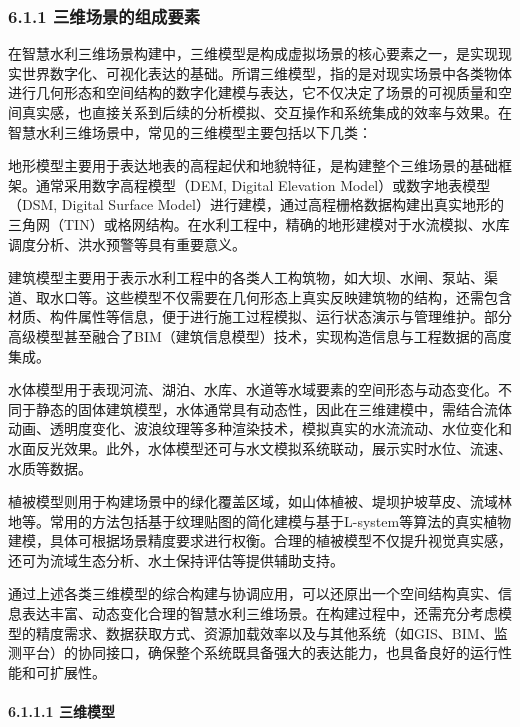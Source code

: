 \subsubsection{6.1.1 三维场景的组成要素}\label{ux4e09ux7ef4ux573aux666fux7684ux7ec4ux6210ux8981ux7d20}

在智慧水利三维场景构建中，三维模型是构成虚拟场景的核心要素之一，是实现现实世界数字化、可视化表达的基础。所谓三维模型，指的是对现实场景中各类物体进行几何形态和空间结构的数字化建模与表达，它不仅决定了场景的可视质量和空间真实感，也直接关系到后续的分析模拟、交互操作和系统集成的效率与效果。在智慧水利三维场景中，常见的三维模型主要包括以下几类：

地形模型主要用于表达地表的高程起伏和地貌特征，是构建整个三维场景的基础框架。通常采用数字高程模型（DEM, Digital Elevation Model）或数字地表模型（DSM, Digital Surface Model）进行建模，通过高程栅格数据构建出真实地形的三角网（TIN）或格网结构。在水利工程中，精确的地形建模对于水流模拟、水库调度分析、洪水预警等具有重要意义。

建筑模型主要用于表示水利工程中的各类人工构筑物，如大坝、水闸、泵站、渠道、取水口等。这些模型不仅需要在几何形态上真实反映建筑物的结构，还需包含材质、构件属性等信息，便于进行施工过程模拟、运行状态演示与管理维护。部分高级模型甚至融合了BIM（建筑信息模型）技术，实现构造信息与工程数据的高度集成。

水体模型用于表现河流、湖泊、水库、水道等水域要素的空间形态与动态变化。不同于静态的固体建筑模型，水体通常具有动态性，因此在三维建模中，需结合流体动画、透明度变化、波浪纹理等多种渲染技术，模拟真实的水流流动、水位变化和水面反光效果。此外，水体模型还可与水文模拟系统联动，展示实时水位、流速、水质等数据。

植被模型则用于构建场景中的绿化覆盖区域，如山体植被、堤坝护坡草皮、流域林地等。常用的方法包括基于纹理贴图的简化建模与基于L-system等算法的真实植物建模，具体可根据场景精度要求进行权衡。合理的植被模型不仅提升视觉真实感，还可为流域生态分析、水土保持评估等提供辅助支持。

通过上述各类三维模型的综合构建与协调应用，可以还原出一个空间结构真实、信息表达丰富、动态变化合理的智慧水利三维场景。在构建过程中，还需充分考虑模型的精度需求、数据获取方式、资源加载效率以及与其他系统（如GIS、BIM、监测平台）的协同接口，确保整个系统既具备强大的表达能力，也具备良好的运行性能和可扩展性。

\paragraph{6.1.1.1 三维模型}\label{ux4e09ux7ef4ux6a21ux578b}

